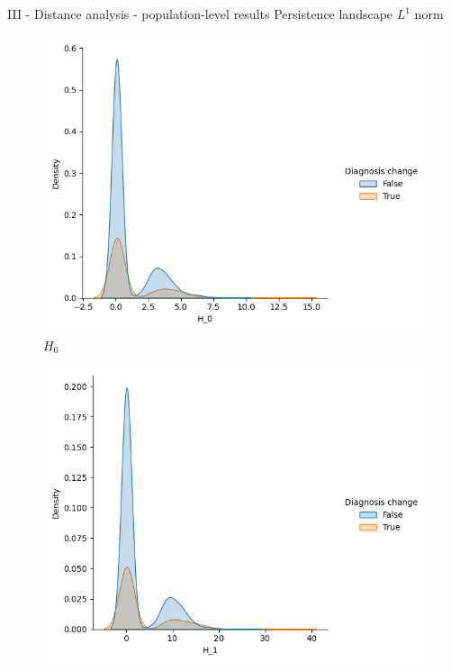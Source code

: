 \documentclass[aspectratio=169, 10pt, dvipsnames]{beamer}
\begin{document}
\begin{frame}[fragile]{III - Distance analysis - population-level results}
Persistence landscape $L^1$ norm\\
  \begin{figure}
    \centering
    \includegraphics[width=\textwidth]{figures/temporal_evolution/landscape_H_0_dist_diag_change.png}
    \caption{$H_0$}
  \end{figure}
  \endminipage
  \hfill
  \begin{figure}
    \centering
    \includegraphics[width=\textwidth]{figures/temporal_evolution/landscape_H_1_dist_diag_change.png}

\end{figure}
\end{frame}
\end{document}
